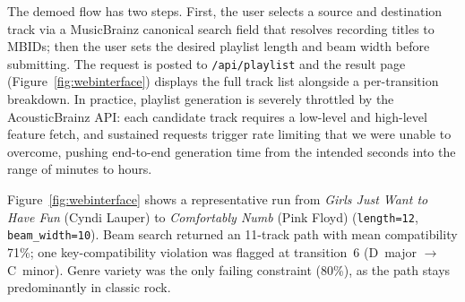 The demoed flow has two steps. First, the user selects a source and destination track via a MusicBrainz canonical search field that resolves recording titles to MBIDs; then the user sets the desired playlist length and beam width before submitting. The request is posted to \texttt{/api/playlist} and the result page (Figure~\ref{fig:webinterface}) displays the full track list alongside a per-transition breakdown. In practice, playlist generation is severely throttled by the AcousticBrainz API: each candidate track requires a low-level and high-level feature fetch, and sustained requests trigger rate limiting that we were unable to overcome, pushing end-to-end generation time from the intended seconds into the range of minutes to hours.

Figure~\ref{fig:webinterface} shows a representative run from \emph{Girls Just Want to Have Fun} (Cyndi Lauper) to \emph{Comfortably Numb} (Pink Floyd) (\texttt{length=12}, \texttt{beam\_width=10}). Beam search returned an 11-track path with mean compatibility 71\%; one key-compatibility violation was flagged at transition~6 (D~major $\to$ C~minor). Genre variety was the only failing constraint (80\%), as the path stays predominantly in classic rock.
